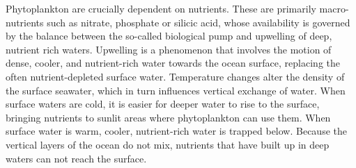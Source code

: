 Phytoplankton are crucially dependent on nutrients. These are primarily macro-nutrients such as nitrate, phosphate or silicic acid, whose availability is governed by the balance between the so-called biological pump and upwelling of deep, nutrient rich waters. Upwelling is a phenomenon that involves the motion of dense, cooler, and nutrient-rich water towards the ocean surface, replacing the often nutrient-depleted surface water. Temperature changes alter the density of the surface seawater, which in turn influences vertical exchange of water. When surface waters are cold, it is easier for deeper water to rise to the surface, bringing nutrients to sunlit areas where phytoplankton can use them. When surface water is warm, cooler, nutrient-rich water is trapped below. Because the vertical layers of the ocean do not mix, nutrients that have built up in deep waters can not reach the surface. 